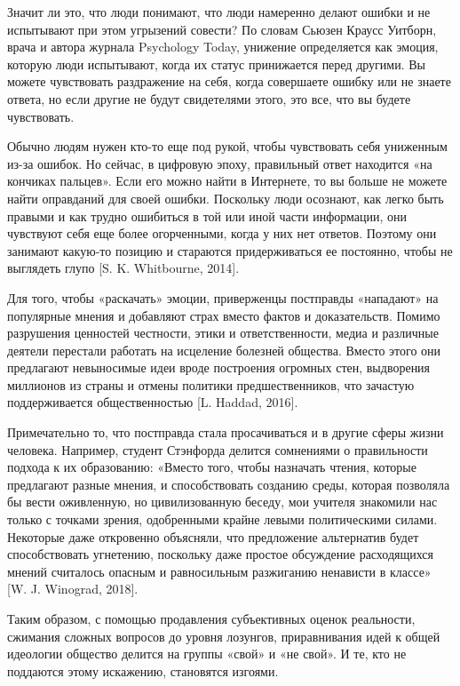 Значит ли это, что люди понимают, что люди намеренно делают ошибки и не испытывают при этом угрызений совести? По словам Сьюзен Краусс Уитборн, врача и автора журнала Psychology Today, унижение определяется как эмоция, которую люди испытывают, когда их статус принижается перед другими. Вы можете чувствовать раздражение на себя, когда совершаете ошибку или не знаете ответа, но если другие не будут свидетелями этого, это все, что вы будете чувствовать.

Обычно людям нужен кто-то еще под рукой, чтобы чувствовать себя униженным из-за ошибок. Но сейчас, в цифровую эпоху, правильный ответ находится «на кончиках пальцев». Если его можно найти в Интернете, то вы больше не можете найти оправданий для своей ошибки. Поскольку люди осознают, как легко быть правыми и как трудно ошибиться в той или иной части информации, они чувствуют себя еще более огорченными, когда у них нет ответов. Поэтому они занимают какую-то позицию и стараются придерживаться ее постоянно, чтобы не выглядеть глупо [S. K. Whitbourne, 2014].

Для того, чтобы «раскачать» эмоции, приверженцы постправды «нападают» на популярные мнения и добавляют страх вместо фактов и доказательств. Помимо разрушения ценностей честности, этики и ответственности, медиа и различные деятели перестали работать на исцеление болезней общества. Вместо этого они предлагают невыносимые идеи вроде построения огромных стен, выдворения миллионов из страны и отмены политики предшественников, что зачастую поддерживается общественностью [L. Haddad, 2016].

Примечательно то, что постправда стала просачиваться и в другие сферы жизни человека. Например, студент Стэнфорда делится сомнениями о правильности подхода к их образованию: «Вместо того, чтобы назначать чтения, которые предлагают разные мнения, и способствовать созданию среды, которая позволяла бы вести оживленную, но цивилизованную беседу, мои учителя знакомили нас только с точками зрения, одобренными крайне левыми политическими силами. Некоторые даже откровенно объясняли, что предложение альтернатив будет способствовать угнетению, поскольку даже простое обсуждение расходящихся мнений считалось опасным и равносильным разжиганию ненависти в классе» [W. J. Winograd, 2018].

Таким образом, с помощью продавления субъективных оценок реальности, сжимания сложных вопросов до уровня лозунгов, приравнивания идей к общей идеологии общество делится на группы «свой» и «не свой». И те, кто не поддаются этому искажению, становятся изгоями.

